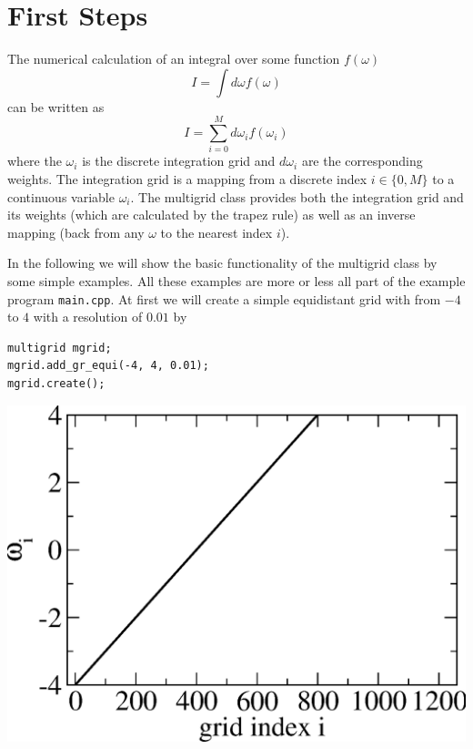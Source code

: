 \section{First Steps}
The numerical calculation of an integral over some function $f(\omega)$
\begin{equation} \label{eqn:integral}
	I=\int d\omega f(\omega)
\end{equation}
can be written as
\begin{equation} \label{eqn:nintegral}
	I=\sum_{i=0}^M d\omega_i f(\omega_i)
\end{equation}
where the $\omega_i$ is the discrete integration grid and $d\omega_i$ are the corresponding weights. The integration grid is a mapping from a discrete index $i\in\{0,M\}$ to a continuous variable $\omega_i$. The multigrid class provides both the integration grid and its weights (which are calculated by the trapez rule) as well as an inverse mapping (back from any $\omega$ to the nearest index $i$).

In the following we will show the basic functionality of the multigrid class by some simple examples. All these examples are more or less all part of the example program \texttt{main.cpp}. At first we will create a simple equidistant grid with from $-4$ to $4$ with a resolution of $0.01$ by 

\vspace{1cm}
\noindent\begin{minipage}[l]{0.6\textwidth}
\begin{lstlisting}
multigrid mgrid;
mgrid.add_gr_equi(-4, 4, 0.01);
mgrid.create();
\end{lstlisting}
\end{minipage}
\begin{minipage}[]{0.4\textwidth}
	\includegraphics[width=1.0\textwidth]{pics/multigrid_00.eps}
\end{minipage}

